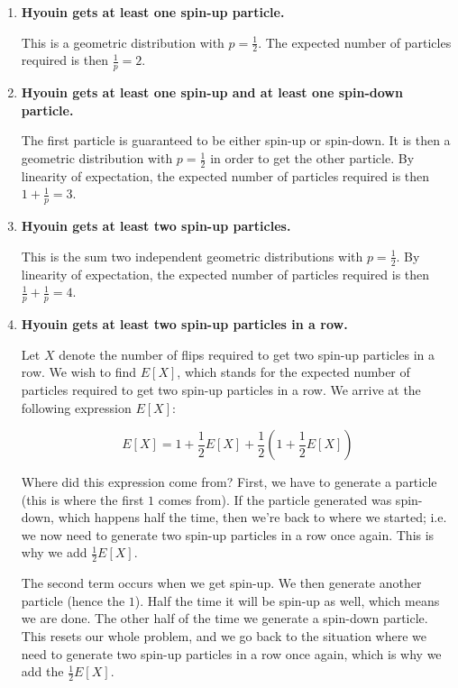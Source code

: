 \documentclass{article}
\begin{document}
\begin{enumerate}[label=(\alph*)]
    \item \textbf{Hyouin gets at least one spin-up particle.}
    
    This is a geometric distribution with $p = \frac{1}{2}$. The expected number of particles required is then $\frac{1}{p} = \boxed{2}$.

    \vspace{1cm}
    
    \item \textbf{Hyouin gets at least one spin-up and at least one spin-down particle.}
    
    The first particle is guaranteed to be either spin-up or spin-down. It is then a geometric distribution with $p = \frac{1}{2}$ in order to get the other particle. By linearity of expectation, the expected number of particles required is then $1 + \frac{1}{p} = \boxed{3}$.

    \vspace{1cm}
    
    \item \textbf{Hyouin gets at least two spin-up particles.}
    
    This is the sum two independent geometric distributions with $p = \frac{1}{2}$. By linearity of expectation, the expected number of particles required is then $\frac{1}{p} + \frac{1}{p} = \boxed{4}$.

    \vspace{1cm}
    
    \item \textbf{Hyouin gets at least two spin-up particles in a row.}
    
    Let $X$ denote the number of flips required to get two spin-up particles in a row. We wish to find $E[X]$, which stands for the expected number of particles required to get two spin-up particles in a row. We arrive at the following expression $E[X]$:
    
    $$E[X] = 1 + \frac{1}{2}E[X] + \frac{1}{2}\left(1 + \frac{1}{2}E[X]\right)$$
    
    Where did this expression come from? First, we have to generate a particle (this is where the first $1$ comes from). If the particle generated was spin-down, which happens half the time, then we're back to where we started; i.e. we now need to generate two spin-up particles in a row once again. This is why we add $\frac{1}{2}E[X]$.
    
    The second term occurs when we get spin-up. We then generate another particle (hence the $1$). Half the time it will be spin-up as well, which means we are done. The other half of the time we generate a spin-down particle. This resets our whole problem, and we go back to the situation where we need to generate two spin-up particles in a row once again, which is why we add the $\frac{1}{2}E[X]$. 
    

\end{enumerate}
\end{document}
